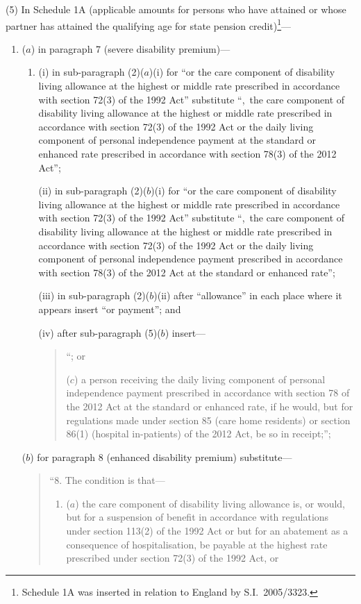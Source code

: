 \documentclass[12pt,a4paper]{article}
\begin{document}
(5) In Schedule 1A (applicable amounts for persons who have attained or whose partner has attained the qualifying age for state pension credit)\footnote{Schedule 1A was inserted in relation to England by S.I.~2005/3323.}—
\begin{enumerate}\item[]
($a$) in paragraph 7 (severe disability premium)—
\begin{enumerate}\item[]
(i) in sub-paragraph (2)($a$)(i)  for “or the care component of disability living allowance at the highest or middle rate prescribed in accordance with section 72(3) of the 1992 Act” substitute “,~the care component of disability living allowance at the highest or middle rate prescribed in accordance with section 72(3) of the 1992 Act or the daily living component of personal independence payment at the standard or enhanced rate prescribed in accordance with section 78(3) of the 2012 Act”;

(ii) in sub-paragraph (2)($b$)(i)  for “or the care component of disability living allowance at the highest or middle rate prescribed in accordance with section 72(3) of the 1992 Act” substitute “,~the care component of disability living allowance at the highest or middle rate prescribed in accordance with section 72(3) of the 1992 Act or the daily living component of personal independence payment prescribed in accordance with section 78(3) of the 2012 Act at the standard or enhanced rate”;

(iii) in sub-paragraph (2)($b$)(ii)  after “allowance” in each place where it appears insert “or payment”; and

(iv) after sub-paragraph (5)($b$)  insert—
\begin{quotation}
“; or

($c$) a person receiving the daily living component of personal independence payment prescribed in accordance with section 78 of the 2012 Act at the standard or enhanced rate, if he would, but for regulations made under section 85 (care home residents) or section 86(1) (hospital in-patients) of the 2012 Act, be so in receipt;”;
\end{quotation}
\end{enumerate}

($b$) for paragraph 8 (enhanced disability premium) substitute—
\begin{quotation}
“8.  The condition is that—
\begin{enumerate}\item[]
($a$) the care component of disability living allowance is, or would, but for a suspension of benefit in accordance with regulations under section 113(2) of the 1992 Act or but for an abatement as a consequence of hospitalisation, be payable at the highest rate prescribed under section 72(3) of the 1992 Act, or


\end{enumerate}
\end{quotation}
\end{enumerate}
\end{document}
